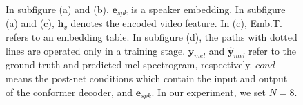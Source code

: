 \documentclass[letterpaper]{article} %
\begin{document}
\begin{figure}
    \centering
    \caption{In subfigure (a) and (b), $\boldsymbol{e}_{spk}$ is a speaker embedding. In subfigure (a) and (c), $\boldsymbol{h}_v$ denotes the encoded video feature. In (c), Emb.T. refers to an embedding table. In subfigure (d), the paths with dotted lines are operated only in a training stage. $\boldsymbol{y}_{mel}$ and $\hat{\boldsymbol{y}}_{mel}$ refer to the ground truth and predicted mel-spectrogram, respectively. $cond$ means the post-net conditions which contain the input and output of the conformer decoder, and $\boldsymbol{e}_{spk}$. In our experiment, we set $N=8$.}
    \label{fig:architecture}
\end{figure}
\end{document}
